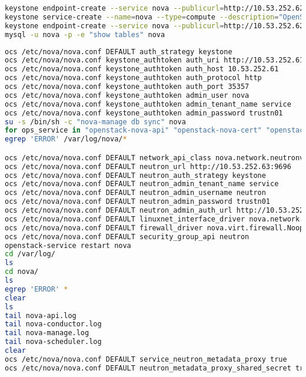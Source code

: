 \documentclass[11pt,letterpaper,oneside]{book}
\begin{document}
\begin{lstlisting}[caption={virctlpaw001},language=bash]
keystone endpoint-create --service nova --publicurl=http://10.53.252.62:8774/v2/%\(tenant_id\)s --internalurl=http://10.53.252.62:8774/v2/%\(tenant_id\)s --adminurl=http://10.53.252.62:8774/v2/%\(tenant_id\)s
keystone service-create --name=nova --type=compute --description="OpenStack Compute"
keystone endpoint-create --service nova --publicurl=http://10.53.252.62:8774/v2/%\(tenant_id\)s --internalurl=http://10.53.252.62:8774/v2/%\(tenant_id\)s --adminurl=http://10.53.252.62:8774/v2/%\(tenant_id\)s
mysql -u nova -p -e "show tables" nova

\end{lstlisting}

\begin{lstlisting}[caption={virctlpaw002},language=bash]
ocs /etc/nova/nova.conf DEFAULT auth_strategy keystone
ocs /etc/nova/nova.conf keystone_authtoken auth_uri http://10.53.252.61:5000
ocs /etc/nova/nova.conf keystone_authtoken auth_host 10.53.252.61
ocs /etc/nova/nova.conf keystone_authtoken auth_protocol http
ocs /etc/nova/nova.conf keystone_authtoken auth_port 35357
ocs /etc/nova/nova.conf keystone_authtoken admin_user nova
ocs /etc/nova/nova.conf keystone_authtoken admin_tenant_name service
ocs /etc/nova/nova.conf keystone_authtoken admin_password trustn01
su -s /bin/sh -c "nova-manage db sync" nova
for ops_service in "openstack-nova-api" "openstack-nova-cert" "openstack-nova-consoleauth" "openstack-nova-scheduler" "openstack-nova-conductor" "openstack-nova-novncproxy"; do systemctl enable $ops_service; systemctl start $ops_service; done
egrep 'ERROR' /var/log/nova/*

ocs /etc/nova/nova.conf DEFAULT network_api_class nova.network.neutronv2.api.API
ocs /etc/nova/nova.conf DEFAULT neutron_url http://10.53.252.63:9696
ocs /etc/nova/nova.conf DEFAULT neutron_auth_strategy keystone
ocs /etc/nova/nova.conf DEFAULT neutron_admin_tenant_name service
ocs /etc/nova/nova.conf DEFAULT neutron_admin_username neutron
ocs /etc/nova/nova.conf DEFAULT neutron_admin_password trustn01
ocs /etc/nova/nova.conf DEFAULT neutron_admin_auth_url http://10.53.252.61:35357/v2.0
ocs /etc/nova/nova.conf DEFAULT linuxnet_interface_driver nova.network.linux_net.LinuxOVSInterfaceDriver
ocs /etc/nova/nova.conf DEFAULT firewall_driver nova.virt.firewall.NoopFirewallDriver
ocs /etc/nova/nova.conf DEFAULT security_group_api neutron
openstack-service restart nova
cd /var/log/
ls
cd nova/
ls
egrep 'ERROR' *
clear
ls
tail nova-api.log 
tail nova-conductor.log 
tail nova-manage.log 
tail nova-scheduler.log 
clear
ocs /etc/nova/nova.conf DEFAULT service_neutron_metadata_proxy true
ocs /etc/nova/nova.conf DEFAULT neutron_metadata_proxy_shared_secret trustn01


\end{lstlisting}
\end{document}
